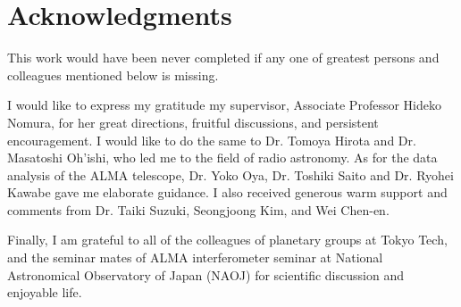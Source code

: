 \chapter*{Acknowledgments}

This work would have been never completed if any one of greatest persons and colleagues mentioned below is missing.

I would like to express my gratitude my supervisor, Associate Professor Hideko Nomura, for her great
directions, fruitful discussions, and persistent encouragement.
I would like to do the same to Dr. Tomoya Hirota and Dr. Masatoshi Oh'ishi, who led me to the field of radio astronomy.
As for the data analysis of the ALMA telescope, Dr. Yoko Oya, Dr. Toshiki Saito and Dr. Ryohei Kawabe gave me elaborate guidance.
I also received generous warm support and comments from Dr. Taiki Suzuki, Seongjoong Kim, and Wei Chen-en.

Finally, I am grateful to all of the colleagues of planetary groups at Tokyo Tech, and the seminar mates of ALMA interferometer seminar at National Astronomical Observatory of Japan (NAOJ) for scientific discussion and enjoyable life.


